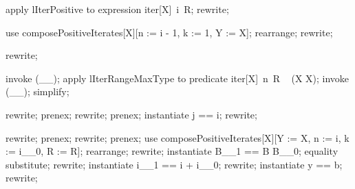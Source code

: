 \begin{LPScript}\begin{forget}[lTrivialIterateCompositionPosRight]
apply lIterPositive to expression iter[X]~i~R;
rewrite;
\end{forget}\end{LPScript}

\begin{LPScript}\begin{forget}[lTrivialIterateCompositionPosLeft]
use composePositiveIterates[X][n := i - 1, k := 1, Y := X];
rearrange;
rewrite;
\end{forget}\end{LPScript}

\begin{LDCheck}\begin{forget}
rewrite;
\end{forget}\end{LDCheck}

\begin{LPScript}\end{LPScript}

\begin{LPScript}\begin{forget}[lIterRangeRelType]
invoke (\_\rel \_);
apply lIterRangeMaxType to predicate iter[X]~n~R \in  \power~  (X \cross  X);
invoke (\_\rel \_);
simplify;
\end{forget}\end{LPScript}

\begin{LPScript}\begin{forget}[lIteratedTransitiveClosureMember]
rewrite;
prenex;
rewrite;
prenex;
instantiate j == i;
rewrite;
\end{forget}\end{LPScript}

\begin{LPScript}\begin{forget}[lIteratedTransitiveClosureElemIsTransitive]
rewrite;
prenex;
rewrite;
prenex;
use composePositiveIterates[X][Y := X, n := i, k := i\_\_0, R := R];
rearrange;
rewrite;
instantiate B\_\_1 == B \comp [X, X, X] B\_\_0;
equality substitute;
rewrite;
instantiate i\_\_1 == i + i\_\_0;
rewrite;
instantiate y == b;
rewrite;
\end{forget}\end{LPScript}

